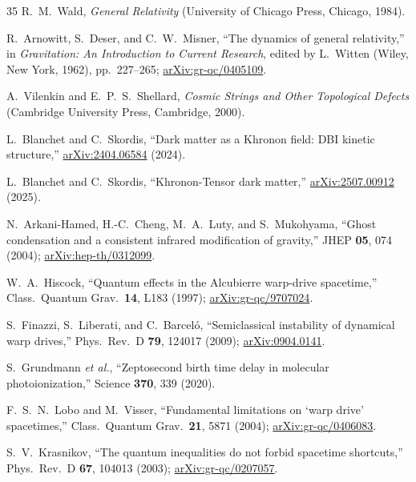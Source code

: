 \documentclass[prd,twocolumn,superscriptaddress,longbibliography]{revtex4-2}
\begin{document}
\begin{thebibliography}{35}
R.~M.~Wald,
\emph{General Relativity}
(University of Chicago Press, Chicago, 1984).

R.~Arnowitt, S.~Deser, and C.~W.~Misner,
``The dynamics of general relativity,''
in \emph{Gravitation: An Introduction to Current Research},
edited by L.~Witten (Wiley, New York, 1962), pp.~227--265;
\href{https://arxiv.org/abs/gr-qc/0405109}{arXiv:gr-qc/0405109}.

A.~Vilenkin and E.~P.~S.~Shellard,
\emph{Cosmic Strings and Other Topological Defects}
(Cambridge University Press, Cambridge, 2000).

L.~Blanchet and C.~Skordis,
``Dark matter as a Khronon field: DBI kinetic structure,''
\href{https://arxiv.org/abs/2404.06584}{arXiv:2404.06584} (2024).

L.~Blanchet and C.~Skordis,
``Khronon-Tensor dark matter,''
\href{https://arxiv.org/abs/2507.00912}{arXiv:2507.00912} (2025).

N.~Arkani-Hamed, H.-C.~Cheng, M.~A.~Luty, and S.~Mukohyama,
``Ghost condensation and a consistent infrared modification of
gravity,''
JHEP \textbf{05}, 074 (2004);
\href{https://arxiv.org/abs/hep-th/0312099}{arXiv:hep-th/0312099}.

W.~A.~Hiscock,
``Quantum effects in the Alcubierre warp-drive spacetime,''
Class.\ Quantum Grav.\ \textbf{14}, L183 (1997);
\href{https://arxiv.org/abs/gr-qc/9707024}{arXiv:gr-qc/9707024}.

S.~Finazzi, S.~Liberati, and C.~Barcel\'{o},
``Semiclassical instability of dynamical warp drives,''
Phys.\ Rev.\ D \textbf{79}, 124017 (2009);
\href{https://arxiv.org/abs/0904.0141}{arXiv:0904.0141}.

S.~Grundmann \textit{et al.},
``Zeptosecond birth time delay in molecular photoionization,''
Science \textbf{370}, 339 (2020).

F.~S.~N.~Lobo and M.~Visser,
``Fundamental limitations on `warp drive' spacetimes,''
Class.\ Quantum Grav.\ \textbf{21}, 5871 (2004);
\href{https://arxiv.org/abs/gr-qc/0406083}{arXiv:gr-qc/0406083}.

S.~V.~Krasnikov,
``The quantum inequalities do not forbid spacetime
shortcuts,''
Phys.\ Rev.\ D \textbf{67}, 104013 (2003);
\href{https://arxiv.org/abs/gr-qc/0207057}{arXiv:gr-qc/0207057}.

\end{thebibliography}
\end{document}
